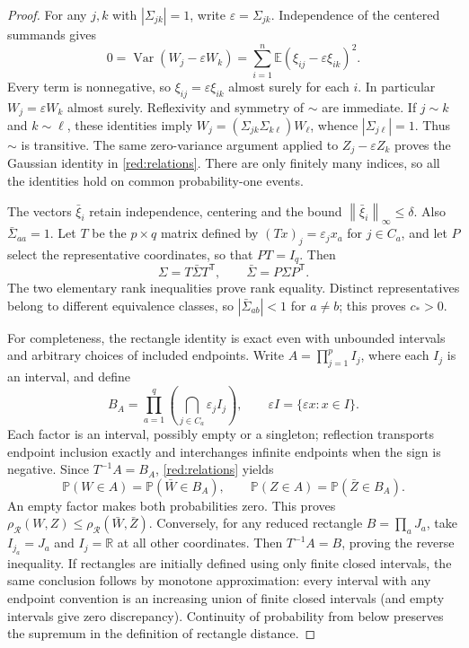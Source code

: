 \documentclass[11pt,a4paper]{article}
\theoremstyle{remark}
\newcommand{\E}{\mathbb E}
\newcommand{\Pp}{\mathbb P}
\newcommand{\R}{\mathbb R}
\newcommand{\Var}{\operatorname{Var}}
\newcommand{\norm}[1]{\left\lVert#1\right\rVert}
\newcommand{\rh}{\rho_{\mathcal R}}
\begin{document}
\begin{proof}
For any \(j,k\) with \(|\Sigma_{jk}|=1\), write
\(\varepsilon=\Sigma_{jk}\).  Independence of the centered summands gives
\[
 0=\Var(W_j-\varepsilon W_k)
  =\sum_{i=1}^n\E(\xi_{ij}-\varepsilon\xi_{ik})^2.
\]
Every term is nonnegative, so
\(\xi_{ij}=\varepsilon\xi_{ik}\) almost surely for each \(i\).
In particular \(W_j=\varepsilon W_k\) almost surely.  Reflexivity and
symmetry of \(\sim\) are immediate.  If \(j\sim k\) and \(k\sim\ell\),
these identities imply
\(W_j=(\Sigma_{jk}\Sigma_{k\ell})W_\ell\), whence
\(|\Sigma_{j\ell}|=1\).  Thus \(\sim\) is transitive.  The same
zero-variance argument applied to \(Z_j-\varepsilon Z_k\) proves the
Gaussian identity in \eqref{red:relations}.  There are only finitely many
indices, so all the identities hold on common probability-one events.

The vectors \(\bar\xi_i\) retain independence, centering and the bound
\(\norm{\bar\xi_i}_\infty\le\delta\).  Also
\(\bar\Sigma_{aa}=1\).  Let \(T\) be the \(p\times q\) matrix defined by
\((Tx)_j=\varepsilon_j x_a\) for \(j\in C_a\), and let \(P\) select
the representative coordinates, so that \(PT=I_q\).  Then
\[
 \Sigma=T\bar\Sigma T^{\mathsf T},\qquad
 \bar\Sigma=P\Sigma P^{\mathsf T}.
\]
The two elementary rank inequalities prove rank equality.  Distinct
representatives belong to different equivalence classes, so
\(|\bar\Sigma_{ab}|<1\) for \(a\ne b\); this proves \(c_*>0\).

For completeness, the rectangle identity is exact even with unbounded
intervals and arbitrary choices of included endpoints.  Write
\(A=\prod_{j=1}^p I_j\), where each \(I_j\) is an interval, and define
\[
 B_A=\prod_{a=1}^q
       \left(\bigcap_{j\in C_a}\varepsilon_j I_j\right),
 \qquad
 \varepsilon I=\{\varepsilon x:x\in I\}.
\]
Each factor is an interval, possibly empty or a singleton; reflection
transports endpoint inclusion exactly and interchanges infinite
endpoints when the sign is negative.  Since \(T^{-1}A=B_A\),
\eqref{red:relations} yields
\[
 \Pp(W\in A)=\Pp(\bar W\in B_A),\qquad
 \Pp(Z\in A)=\Pp(\bar Z\in B_A).
\]
An empty factor makes both probabilities zero.  This proves
\(\rh(W,Z)\le\rh(\bar W,\bar Z)\).  Conversely, for any reduced rectangle
\(B=\prod_a J_a\), take \(I_{j_a}=J_a\) and \(I_j=\R\) at all other
coordinates.  Then \(T^{-1}A=B\), proving the reverse inequality.
If rectangles are initially defined using only finite closed intervals,
the same conclusion follows by monotone approximation: every interval
with any endpoint convention is an increasing union of finite closed
intervals (and empty intervals give zero discrepancy).  Continuity of
probability from below preserves the supremum in the definition of
rectangle distance.
\end{proof}
\end{document}
